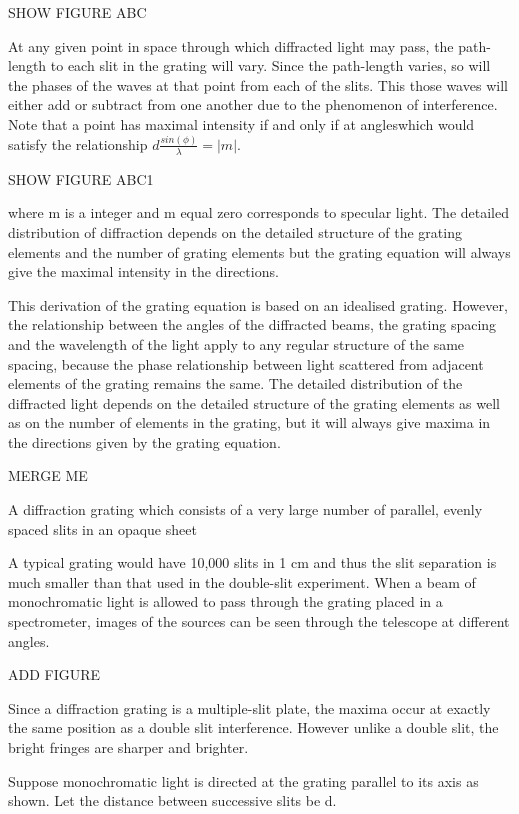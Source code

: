 SHOW FIGURE ABC

At any given point in space through which diffracted light may pass, the path-length to each slit in the grating will vary. Since the path-length varies, so will the phases of the waves at that point from each of the slits. This those waves will either add or subtract from one another due to the phenomenon of interference. Note that a point has maximal intensity if and only if at angleswhich would satisfy the relationship $d \frac{sin(\phi)}{\lambda} = |m|$. 

SHOW FIGURE ABC1

where m is a integer and m equal zero corresponds to specular light. 
The detailed distribution of diffraction depends on the detailed structure of the grating elements and the number of grating elements but the grating equation will always give the maximal intensity in the directions.

This derivation of the grating equation is based on an idealised grating. However, the relationship between the angles of the diffracted beams, the grating spacing and the wavelength of the light apply to any regular structure of the same spacing, because the phase relationship between light scattered from adjacent elements of the grating remains the same. The detailed distribution of the diffracted light depends on the detailed structure of the grating elements as well as on the number of elements in the grating, but it will always give maxima in the directions given by the grating equation.


MERGE ME

A diffraction grating which consists of a very large number of parallel, evenly spaced slits in an opaque sheet

A typical grating would have 10,000 slits in 1 cm and thus the slit separation is much smaller than that used in the double-slit experiment. When a beam of monochromatic light is allowed to pass through the grating placed in a spectrometer, images of the sources can be seen through the telescope at different angles.

ADD FIGURE

Since a diffraction grating is a multiple-slit plate, the maxima occur at exactly the same position as a double slit interference. However unlike a double slit, the bright fringes are sharper and brighter.

Suppose monochromatic light is directed at the grating parallel to its axis as shown. Let the distance between successive slits be d.

